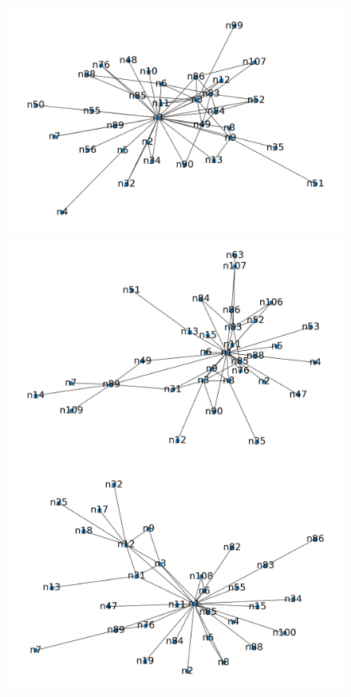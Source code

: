 \begin{figure}[htbp]
	\centering
	\begin{minipage}{.32\textwidth}
		\centering
		\includegraphics[width=1\linewidth]{problem_02/network_labels_phase3}
	\end{minipage}
	\begin{minipage}{.32\textwidth}
		\centering
		\includegraphics[width=1\linewidth]{problem_02/network_labels_phase4}
	\end{minipage}
	\begin{minipage}{.32\textwidth}
		\centering
		\includegraphics[width=1\linewidth]{problem_02/network_labels_phase5}

\end{minipage}
\end{figure}
